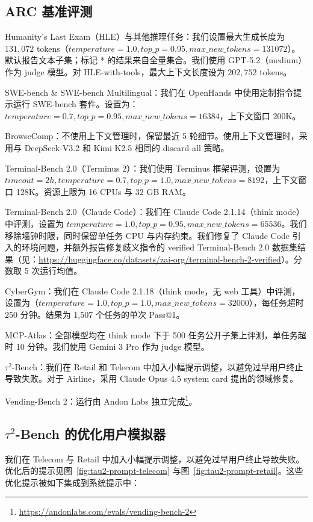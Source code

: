 \subsection{ARC 基准评测}
\label{sec:eval_details_arc}
Humanity’s Last Exam（HLE）与其他推理任务：我们设置最大生成长度为 $131,072$ tokens（$temperature=1.0, top\_p=0.95, max\_new\_tokens=131072$）。默认报告文本子集；标记 * 的结果来自全量集合。我们使用 GPT-5.2（medium）作为 judge 模型。对 HLE-with-tools，最大上下文长度设为 $202,752$ tokens。

SWE-bench \& SWE-bench Multilingual：我们在 OpenHands 中使用定制指令提示运行 SWE-bench 套件。设置为：$temperature=0.7, top\_p=0.95, max\_new\_tokens=16384$，上下文窗口 200K。

BrowseComp：不使用上下文管理时，保留最近 5 轮细节。使用上下文管理时，采用与 DeepSeek-V3.2 和 Kimi K2.5 相同的 discard-all 策略。

Terminal-Bench 2.0（Terminus 2）：我们使用 Terminus 框架评测，设置为 $timeout=2h, temperature=0.7, top\_p=1.0, max\_new\_tokens=8192$，上下文窗口 128K。资源上限为 16 CPUs 与 32 GB RAM。

Terminal-Bench 2.0（Claude Code）：我们在 Claude Code 2.1.14（think mode）中评测，设置为 $temperature=1.0, top\_p=0.95, max\_new\_tokens=65536$。我们移除墙钟时限，同时保留单任务 CPU 与内存约束。我们修复了 Claude Code 引入的环境问题，并额外报告修复歧义指令的 verified Terminal-Bench 2.0 数据集结果（见：\url{https://huggingface.co/datasets/zai-org/terminal-bench-2-verified}）。分数取 5 次运行均值。

CyberGym：我们在 Claude Code 2.1.18（think mode，无 web 工具）中评测，设置为（$temperature=1.0, top\_p=1.0, max\_new\_tokens=32000$），每任务超时 250 分钟。结果为 1,507 个任务的单次 Pass@1。

MCP-Atlas：全部模型均在 think mode 下于 500 任务公开子集上评测，单任务超时 10 分钟。我们使用 Gemini 3 Pro 作为 judge 模型。

$\tau^2$-Bench：我们在 Retail 和 Telecom 中加入小幅提示调整，以避免过早用户终止导致失败。对于 Airline，采用 Claude Opus 4.5 system card 提出的领域修复。

Vending-Bench 2：运行由 Andon Labs 独立完成\footnote{\url{https://andonlabs.com/evals/vending-bench-2}}。


\subsection{$\tau^2$-Bench 的优化用户模拟器}
\label{sec:tau_user_prompt}
我们在 Telecom 与 Retail 中加入小幅提示调整，以避免过早用户终止导致失败。优化后的提示见图~\ref{fig:tau2-prompt-telecom} 与图~\ref{fig:tau2-prompt-retail}。这些优化提示被如下集成到系统提示中：


